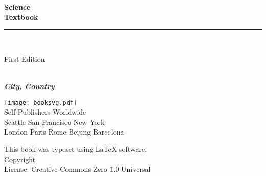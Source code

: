 \documentclass{book}
\makeatletter
\newcommand{\booksubtitle}{A Latex Template for a Science Textbook}
\newcommand{\booklicense}{Creative Commons Zero 1.0 Universal}
\newcommand{\authorsubtitle}{City, Country}
\newcommand{\bookauthor}{\@author}
\makeatother
\begin{document}
\begin{titlepage}
\begin{flushleft}

\textbf{\fontsize{48}{54}\selectfont Science\\Textbook\\}

\par\noindent\rule{\textwidth}{4pt}\\


\begin{flushright}
\Large First Edition
\end{flushright}

\vspace{\fill}

\textbf{\large \bookauthor}\\[3.5pt]
\textbf{\large \textit{\authorsubtitle}}

\vspace{\fill}

\begin{center}
\texttt{[image: booksvg.pdf]}\\[4pt]
\small{Self Publishers Worldwide\\
Seattle San Francisco New York\\
London Paris Rome Beijing Barcelona}
\end{center}

\end{flushleft}
\end{titlepage}
\restoregeometry

\thispagestyle{empty}

\begin{flushleft}
\vspace*{\fill}
This book was typeset using \LaTeX{} software.\\
\vspace{\fill}
Copyright \textcopyright{} \the\year{}  \bookauthor\\
License: \booklicense
\end{flushleft}
\end{document}
